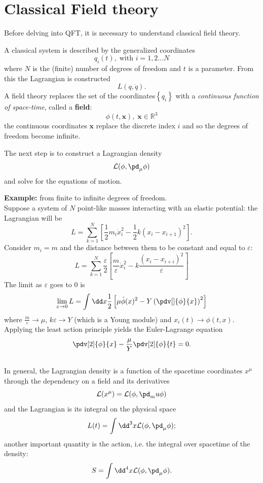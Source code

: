 \section{Classical Field theory}
Before delving into QFT, it is necessary to understand classical field theory.

A classical system is described by the generalized coordinates
$$q_i(t),\;\text{with }i=1,2...N$$
where $N$ is the (finite) number of degrees of freedom and $t$ is a parameter.
From this the Lagrangian is constructed
$$L(q,\dot q).$$
A field theory replaces the set of the coordinates$\left\{q_i\right\}$ with a
\textit{continuous function of space-time}, called a \textbf{field}:
$$\phi(t,\mathbf{x}),\;\mathbf{x}\in\mathbb{R}^3$$
the continuous coordinates $\mathbf{x}$ replace the discrete index $i$ and so the
degrees of freedom become infinite.

The next step is to construct a Lagrangian density
$$\mathcal{L}(\phi,\pd_\mu\phi)$$
and solve for the equations of motion.

\textbf{Example:} from finite to infinite degrees of freedom.\\
Suppose a system of $N$ point-like masses interacting with an elastic potential:
the Lagrangian will be
$$L=\sum_{k=1}^{N}\left[\frac{1}{2}m_i\dot x_i^2-\frac{1}{2}k(x_i-x_{i+1})^2\right].$$
Consider $m_i = m$ and the distance between them to be constant and equal to
$\varepsilon$:
$$L = \sum_{k=1}^{N}\frac{\varepsilon}{2}\left[\frac{m}{\varepsilon}\dot x_i^2
    -k\frac{(x_i-x_{i+i})^2}{\varepsilon}\right]$$
The limit as $\varepsilon$ goes to 0 is
$$\lim\limits_{\varepsilon\to0} L = \int_{}^{}\dd x \frac{1}{2}\left[
\mu\dot\phi(x)^2 - Y\left(\pdv[]{\phi}{x}\right)^2\right]$$
where $\frac{m}{\varepsilon}\rightarrow\mu$, $k\varepsilon\rightarrow Y$
(which is a Young module) and $x_i(t)\rightarrow\phi(t,x)$.
Applying the least action principle yields the Euler-Lagrange equation
$$\pdv[2]{\phi}{x} - \frac{\mu}{Y}\pdv[2]{\phi}{t} = 0.$$\\

In general, the Lagrangian density is a function of the spacetime coordinates $x^\mu$
through the dependency on a field and its derivatives
$$\mathcal{L}(x^\mu) = \mathcal{L}(\phi,\pd_mu\phi)$$
and the Lagrangian is its integral on the physical space
$$L(t) = \int_{}^{}\dd^3 x \mathcal{L}(\phi,\pd_\mu\phi);$$
another important quantity is the action, i.e. the integral over spacetime of the
density:
$$S = \int_{}^{}\dd^4x \mathcal{L}(\phi,\pd_\mu\phi).$$\\

